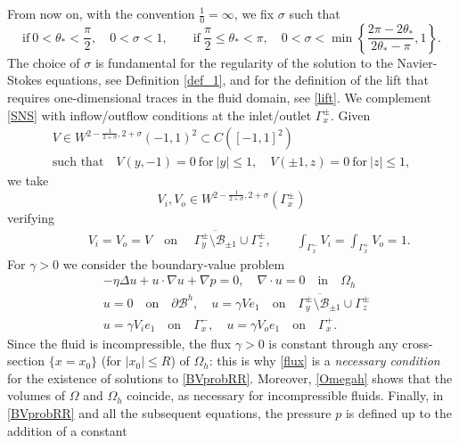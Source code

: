 \documentclass[11pt,a4paper]{amsart}
\theoremstyle{remark}
\theoremstyle{definition}
\numberwithin{equation}{section}
\numberwithin{proposition}{section}
\begin{document}
	
From now on, with the convention $\tfrac{1}{0}=\infty$, we fix $\sigma$ such that    \begin{equation}\label{eq_sigma}
    \text{if}\  0< \theta_* < \frac{\pi}{2}, \quad
    0<\sigma < 1, \qquad  \text{if} \ \frac{\pi}{2}\leq \theta_* < \pi,  \quad
    0<\sigma < \min\left\{\frac{2\pi-2\theta_*}{2\theta_*-\pi},1\right\}.
\end{equation} The choice of $\sigma$ is fundamental for the regularity of the solution to the Navier-Stokes equations, see Definition \ref{def_1}, and for the definition of the lift that requires one-dimensional traces in the fluid domain, see \eqref{lift}. We complement \eqref{SNS} with inflow/outflow conditions at the inlet/outlet $\Gamma_x^\pm$.
	Given $$\begin{array}{c}V\in W^{2-\tfrac{1}{2+\sigma}, 2+\sigma }(-1,1)^2\subset C([-1,1]^2)  \\[5pt] \text{such that} \quad  V(y,-1)=0 \ \text{for} \ |y|\le1,  \quad V(\pm1 ,z)=0 \ \text{for} \ |z|\le1,\end{array}$$ we take $$V_i, V_o \in W^{2-\tfrac{1}{2+\sigma}, 2+\sigma }(\Gamma_x^\pm)$$ verifying
	\begin{align}
		&\quad \quad V_i=V_o=V\quad \mbox{on }\quad \overline{\Gamma_{y}^\pm \setminus \mathcal{B}_{\pm 1}}\cup\Gamma_z^\pm, \qquad
		\int_{\Gamma_x^-} V_i=\int_{\Gamma_x^+} V_o=1.\label{flux}
	\end{align}
	For $\gamma>0$ we consider the boundary-value problem
\begin{equation}\label{BVprobRR}
	\begin{aligned}
		&-\eta\Delta u+u\cdot\nabla u+\nabla p=0,\quad\nabla\cdot u=0\quad\text{in}\quad \Omega_h\\[2pt]
		&u=0 \quad \text{on} \quad  \partial \mathcal{B}^h ,\quad u=\gamma Ve_1\quad \text{on} \quad \overline{\Gamma_{y}^\pm \setminus \mathcal{B}_{\pm 1}}\cup\Gamma_z^\pm\\[2pt]
		&u= \gamma V_ie_1\quad \text{on} \quad \Gamma_x^-,\quad u= \gamma V_oe_1\quad\text{on} \quad \Gamma_x^+.
	\end{aligned}
\end{equation}
	Since the fluid is incompressible, the flux $\gamma>0$ is constant through any cross-section $\{x=x_0\}$ (for $|x_0|\le R$) of $\Omega_h$:
	this is why \eqref{flux} is a {\em necessary condition} for the existence of solutions to \eqref{BVprobRR}.
Moreover, \eqref{Omegah} shows that the volumes of $\Omega$ and $\Omega_h$ coincide, as necessary for incompressible fluids. Finally, in \eqref{BVprobRR} and all the subsequent equations, the pressure $p$ is defined up to the addition of a constant
\end{document}
